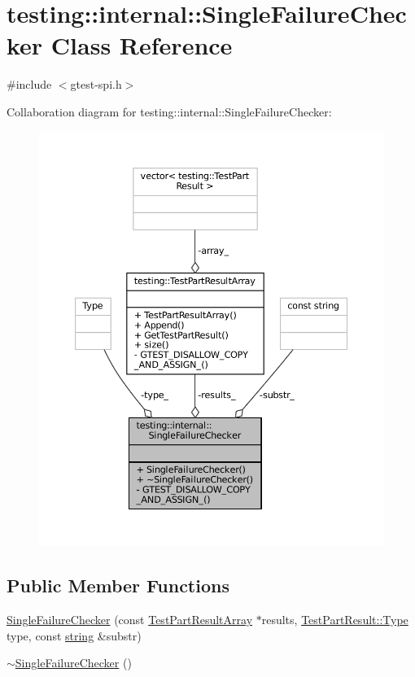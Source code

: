 \hypertarget{classtesting_1_1internal_1_1SingleFailureChecker}{}\section{testing\+:\+:internal\+:\+:Single\+Failure\+Checker Class Reference}
\label{classtesting_1_1internal_1_1SingleFailureChecker}


{\ttfamily \#include $<$gtest-\/spi.\+h$>$}



Collaboration diagram for testing\+:\+:internal\+:\+:Single\+Failure\+Checker\+:
\nopagebreak
\begin{figure}[H]
\begin{center}
\leavevmode
\includegraphics[width=350pt]{classtesting_1_1internal_1_1SingleFailureChecker__coll__graph}
\end{center}
\end{figure}
\subsection*{Public Member Functions}
\begin{DoxyCompactItemize}
\item 
\hyperlink{classtesting_1_1internal_1_1SingleFailureChecker_a6d350d385526c97c9982e928f5f8fb56}{Single\+Failure\+Checker} (const \hyperlink{classtesting_1_1TestPartResultArray}{Test\+Part\+Result\+Array} $\ast$results, \hyperlink{classtesting_1_1TestPartResult_a65ae656b33fdfdfffaf34858778a52d5}{Test\+Part\+Result\+::\+Type} type, const \hyperlink{namespacetesting_1_1internal_a8e8ff5b11e64078831112677156cb111}{string} \&substr)
\item 
\hyperlink{classtesting_1_1internal_1_1SingleFailureChecker_a4b0a907c9c1b350c79d70af138e9f0bf}{$\sim$\+Single\+Failure\+Checker} ()
\end{DoxyCompactItemize}
